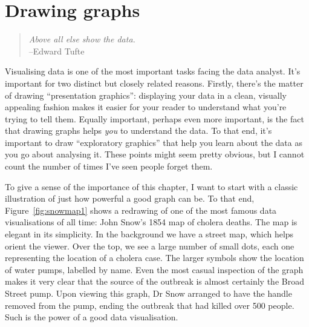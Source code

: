 

\chapter{Drawing graphs\label{ch:graphics}}

\begin{quote}
{\it Above all else show the data.}\\
\hspace*{2cm} --Edward Tufte
\end{quote}

\noindent
Visualising data is one of the most important tasks facing the data analyst. It's important for two distinct but closely related reasons. Firstly, there's the matter of drawing ``presentation graphics'': displaying your data in a clean, visually appealing fashion makes it easier for your reader to understand what you're trying to tell them. Equally important, perhaps even more important, is the fact that drawing graphs helps {\it you} to understand the data. To that end, it's important to draw ``exploratory graphics'' that help you learn about the data as you go about analysing it. These points might seem pretty obvious, but I cannot count the number of times I've seen people forget them. 

To give a sense of the importance of this chapter, I want to start with a classic illustration of just how powerful a good graph can be. To that end, Figure~\ref{fig:snowmap1} shows a redrawing of one of the most famous data visualisations of all time: John Snow's 1854 map of cholera deaths. The map is elegant in its simplicity. In the background we have a street map, which helps orient the viewer. Over the top, we see a large number of small dots, each one representing the location of a cholera case. The larger symbols show the location of water pumps, labelled by name. Even the most casual inspection of the graph makes it very clear that the source of the outbreak is almost certainly the Broad Street pump. Upon viewing this graph, Dr Snow arranged to have the handle removed from the pump, ending the outbreak that had killed over 500 people. Such is the power of a good data visualisation.


